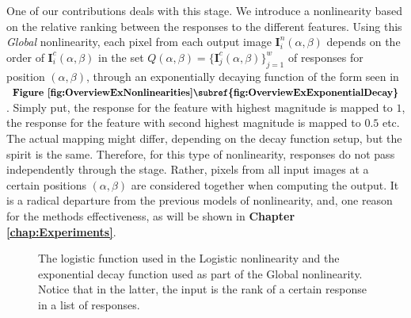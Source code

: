 \documentclass[12pt,a4paper,oneside,english]{UPBThesis}
\begin{document}
One of our contributions deals with this stage. We introduce a nonlinearity based on the relative ranking between the responses to the different features. Using this \emph{Global} nonlinearity, each pixel from each output image $\textbf{I}_i^n(\alpha,\beta)$ depends on the order of $\textbf{I}_i^c(\alpha,\beta)$ in the set $Q(\alpha,\beta) = \{\textbf{I}_j^c(\alpha,\beta)\}_{j=1}^w$ of responses for position $(\alpha,\beta)$, through an exponentially decaying function of the form seen in $\textbf{Figure \ref{fig:OverviewExNonlinearities}\subref{fig:OverviewExExponentialDecay}}$. Simply put, the response for the feature with highest magnitude is mapped to $1$, the response for the feature with second highest magnitude is mapped to $0.5$ etc. The actual mapping might differ, depending on the decay function setup, but the spirit is the same. Therefore, for this type of nonlinearity, responses do not pass independently through the stage. Rather, pixels from all input images at a certain positions $(\alpha,\beta)$ are considered together when computing the output. It is a radical departure from the previous models of nonlinearity, and, one reason for the methods effectiveness, as will be shown in \textbf{Chapter \ref{chap:Experiments}}.

\begin{figure}
\centering
{}
\caption{The logistic function used in the Logistic nonlinearity and the exponential decay function used as part of the Global nonlinearity. Notice that in the latter, the input is the rank of a certain response in a list of responses.}
\label{fig:OverviewExNonlinearities}
\end{figure}
\end{document}
